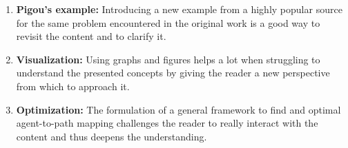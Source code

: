 \documentclass[../review.tex]{subfiles}
\begin{document}
\begin{enumerate}
 \item \textbf{Pigou's example:} Introducing a new example from a highly popular source for the same problem encountered in the original work is a good way to revisit the content and to clarify it.
 \item \textbf{Visualization:} Using graphs and figures helps a lot when struggling to understand the presented concepts by giving the reader a new perspective from which to approach it.
 \item \textbf{Optimization:} The formulation of a general framework to find and optimal agent-to-path mapping challenges the reader to really interact with the content and thus deepens the understanding.
\end{enumerate}
\end{document}
